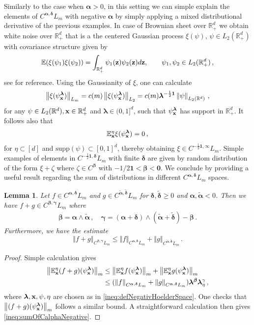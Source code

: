 \documentclass[12pt]{article}
\numberwithin{equation}{section}
\theoremstyle{plain}
\newtheorem{lemma}[theorem]{Lemma}
\theoremstyle{definition}
\newcommand{\norm}[1]{\left\Vert #1\right\Vert}
\def\bR{\mathbb{R}}\def\bS{\mathbb{S}}
\def\bE{\mathbb{E}}\def\bW{\mathbb{W}}
\def\falpha{{\boldsymbol\alpha}}
\def\fbeta{{\boldsymbol\beta}}
\def\fgamma{{\boldsymbol\gamma}}
\def\fdelta{{\boldsymbol\delta}}
\def\flambda{{\boldsymbol\lambda}}
\def\foo{{\boldsymbol 0}}
\def\fone{{\boldsymbol 1}}
\def\supp{\mbox{supp}}
\begin{document}
Similarly to the case when $\falpha>0$, in this setting we can  simple explain the  elements of $C^{\falpha,\fdelta}L_m$ with negative $\falpha$ by simply applying a mixed distributional derivative of the previous examples.  In case of Brownian sheet over $\bR_+^d$ we obtain white noise over $\bR_+^d$ that is a the centered Gaussian process $\xi(\psi)$, $\psi\in L_2(\bR_+^d)$ with covariance structure given by
\[
\bE(\xi(\psi_1)\xi(\psi_2)) = \int_{\bR^d_+} \psi_1(\fz)\psi_2(\fz) d\fz,\qquad \psi_1,\psi_2\in L_2(\bR_+^d)\,,
\]
see \cite{nualart1995malliavin} for reference. Using the Gaussianity of $\xi$, one can calculate
\begin{align*}
    \norm{\xi(\psi_\fx^\flambda)}_{L_m} = c(m) \norm{\xi(\psi_\fx^\flambda)}_{L_2}= c(m) \flambda^{-\frac 12 \fone}\norm{\psi}_{L_2(\bR^d)}\,,
\end{align*}
for any $\psi\in L_2(\bR^d), \fx\in\bR^d_+$ and $\flambda\in(0,1]^d$, such that $\psi_\fx^\flambda$ has support in $\bR^d_+$. It follows also that
\[
    \bE^\eta_\fx \xi(\psi_\fx^\flambda) = 0\,,
\]
for $\eta\subset[d]$ and $\supp(\psi)\subset[0,1]^d$, thereby obtaining $\xi\in C^{-\frac 12\fone,\infty}L_m$. Simple examples of elements  in  $C^{-\frac 12\fone,\fdelta}L_m$  with finite $\fdelta$ are given by random distribution of the form $\xi+ \zeta $ where $\zeta\in  C^{\fbeta}$  with $-1/2\fone<\fbeta<\foo$. We conclude by providing a useful result regarding the sum of distributions in different $C^{\falpha,\fdelta}L_{m}$ spaces.

\begin{lemma}\label{lem:sumOfCalpha}
    Let $f\in C^{\falpha,\fdelta}L_m$ and $g\in C^{\tilde\falpha,\tilde\fdelta}L_m$ for $\fdelta,\tilde\fdelta\ge 0$ and $\falpha,\tilde\falpha <0$. Then we have $f+g\in C^{\fbeta,\fgamma}L_m$ where 
    \begin{align*}
        \fbeta = \falpha\wedge\tilde\falpha\,, 
        \quad \fgamma = (\falpha+\fdelta)\wedge(\tilde\falpha+\tilde\fdelta)-\fbeta\,.
    \end{align*}
    Furthermore, we have the estimate
    \begin{equation}\label{ineq:sumOfCalphaNegative}
        \norm{f+g}_{C^{\fbeta,\fgamma}L_m} \le \norm{f}_{C^{\falpha,\fdelta}L_m} + \norm{g}_{C^{\tilde\falpha,\tilde\fdelta}L_m}\,.
    \end{equation}
\end{lemma}

\begin{proof}
    Simple calculation gives
    \begin{align*}
    \norm{\bE_\fx^\eta(f+g)(\psi_\fx^\flambda)}_m &\le \norm{\bE_\fx^\eta f(\psi_\fx^\flambda)}_m + \norm{\bE_\fx^\eta g(\psi_\fx^\flambda)}_m \\
    &\le (\norm{f}_{C^{\falpha,\fdelta}L_m}+\norm{g}_{C^{\falpha,\fdelta}L_m}) \flambda^{\fbeta}\flambda_\eta^{\gamma}\,,
    \end{align*}
  where $\flambda,\fx,\psi,\eta$ are chosen as in \eqref{ineq:defNegativHoelderSpace}. One checks that $\norm{(f+g)(\psi_\fx^\flambda)}_m$ follows a similar bound. A straightforward calculation then gives \eqref{ineq:sumOfCalphaNegative}.
\end{proof}
\end{document}
